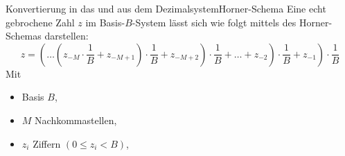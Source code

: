 \documentclass[xelatex,aspectratio=169]{beamer}
\begin{document}
\begin{frame}[t]{Konvertierung in das und aus dem Dezimalsystem}{Horner-Schema}
  Eine echt gebrochene Zahl $z$ im Basis-$B$-System lässt sich wie folgt mittels des Horner-Schemas darstellen:
  \[ z = \left( \left. \left. \ldots \left( z_{-M} \cdot \frac{1}{B} + z_{-M+1} \right) \cdot \frac{1}{B} + z_{-M+2} \right) \cdot \frac{1}{B} + \ldots + z_{-2} \right) \cdot \frac{1}{B} + z_{-1} \right) \cdot \frac{1}{B} \]
  Mit
  \begin{itemize}
    \item Basis $B$,
    \item $M$ Nachkommastellen,
    \item $z_i$ Ziffern $\left(0 \leq z_i < B\right)$,
  \end{itemize}

\end{frame}

\end{document}
